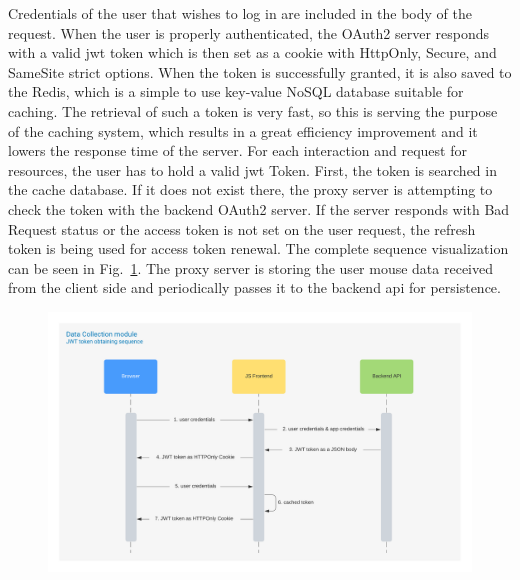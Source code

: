 Credentials of the user that wishes to log in are included in the body of the request.
When the user is properly authenticated, the OAuth2 server responds with a valid \gls{jwt} token which is then set as a cookie with HttpOnly, Secure, and SameSite strict options.
When the token is successfully granted, it is also saved to the Redis, which is a simple to use key-value NoSQL database suitable for caching.
The retrieval of such a token is very fast, so this is serving the purpose of the caching system, which results in a great efficiency improvement and it lowers the response time of the server.
For each interaction and request for resources, the user has to hold a valid \gls{jwt} Token.
First, the token is searched in the cache database.
If it does not exist there, the proxy server is attempting to check the token with the backend OAuth2 server.
If the server responds with Bad Request status or the access token is not set on the user request, the refresh token is being used for access token renewal.
The complete sequence visualization can be seen in \mbox{Fig.~\ref{fig:jwt-sequence}}.
The proxy server is storing the user mouse data received from the client side and periodically passes it to the backend \gls{api} for persistence.


\begin{figure}[!hbt]
    
    \centering
    \includegraphics[width=\linewidth]{resources/jwt_sequence_diagram.png}
    \captionsetup{width=\linewidth}
    \label{fig:jwt-sequence}
\end{figure}